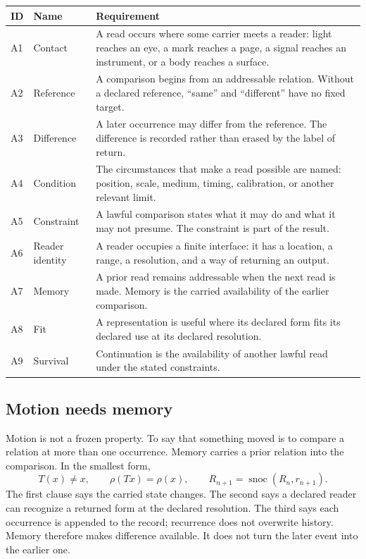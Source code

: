 \documentclass[11pt]{article}
\newcommand{\snoc}{\operatorname{snoc}}
\begin{document}
\begin{longtable}{@{}p{}p{}p{}@{}}
\toprule
\textbf{ID} & \textbf{Name} & \textbf{Requirement}\\
\midrule
\endhead
\bottomrule
\endfoot
A1 & Contact & A read occurs where some carrier meets a reader: light reaches an eye, a mark reaches a page, a signal reaches an instrument, or a body reaches a surface.\\
A2 & Reference & A comparison begins from an addressable relation. Without a declared reference, ``same'' and ``different'' have no fixed target.\\
A3 & Difference & A later occurrence may differ from the reference. The difference is recorded rather than erased by the label of return.\\
A4 & Condition & The circumstances that make a read possible are named: position, scale, medium, timing, calibration, or another relevant limit.\\
A5 & Constraint & A lawful comparison states what it may do and what it may not presume. The constraint is part of the result.\\
A6 & Reader identity & A reader occupies a finite interface: it has a location, a range, a resolution, and a way of returning an output.\\
A7 & Memory & A prior read remains addressable when the next read is made. Memory is the carried availability of the earlier comparison.\\
A8 & Fit & A representation is useful where its declared form fits its declared use at its declared resolution.\\
A9 & Survival & Continuation is the availability of another lawful read under the stated constraints.\\
\end{longtable}

\subsection{Motion needs memory}
Motion is not a frozen property. To say that something moved is to compare a relation at more than one occurrence. Memory carries a prior relation into the comparison. In the smallest form,
\begin{equation}
T(x)\neq x,\qquad \rho(Tx)=\rho(x),\qquad
R_{n+1}=\snoc(R_n,r_{n+1}).
\label{eq:return}
\end{equation}
The first clause says the carried state changes. The second says a declared reader can recognize a returned form at the declared resolution. The third says each occurrence is appended to the record; recurrence does not overwrite history. Memory therefore makes difference available. It does not turn the later event into the earlier one.
\end{document}
